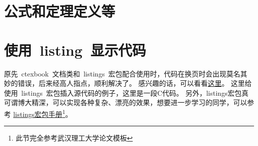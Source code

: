 \section{公式和定理定义等}
    \section{使用~listing~显示代码}
原先~ctexbook~文档类和~listings~宏包配合使用时，代码在换页时会出现莫名其妙的错误，后来经高人指点，顺利解决了。
感兴趣的话，可以看看\href{http://bbs.ctex.org/viewthread.php?tid=53451}{这里}。
这里给使用~listings~宏包插入源代码的例子，这里是一段C代码。
另外，listings宏包真可谓博大精深，可以实现各种复杂、漂亮的效果，想要进一步学习的同学，可以参考
\href{http://mirror.ctan.org/macros/latex/contrib/listings/listings.pdf}{listings宏包手册\footnote{此节完全参考武汉理工大学论文模板}}。